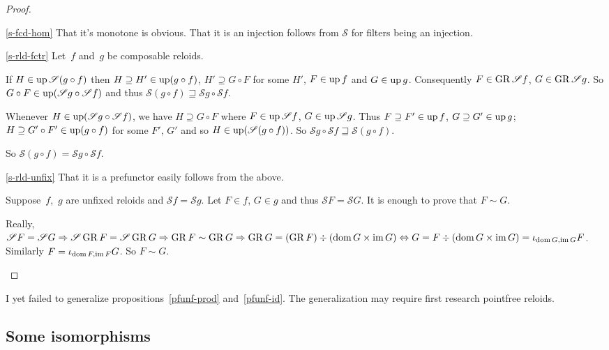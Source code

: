 \begin{proof}
~
\begin{widedisorder}
\item[\ref{s-fcd-hom}] That it's monotone is obvious.
That it is an injection follows from $\mathscr{S}$ for filters
being an injection.

\item[\ref{s-rld-fctr}]
Let~$f$ and~$g$ be composable reloids.

If $H\in\operatorname{up}\mathscr{S}(g\circ f)$ then
$H\supseteq H'\in\operatorname{up}(g\circ f)$,
$H'\supseteq G\circ F$ for some $H'$,
$F\in\operatorname{up} f$ and $G\in\operatorname{up} g$. Consequently
$F\in\operatorname{GR}\mathscr{S}f$, $G\in\operatorname{GR}\mathscr{S}g$. So
$G\circ F\in\operatorname{up}(\mathscr{S}g\circ\mathscr{S}f)$
and thus
$\mathscr{S}(g\circ f)\sqsupseteq
\mathscr{S}g\circ\mathscr{S}f$.

Whenever $H\in\operatorname{up}(\mathscr{S}g\circ\mathscr{S}f)$,
we have
$H\supseteq G\circ F$ where $F\in\operatorname{up}\mathscr{S}f$,
$G\in\operatorname{up}\mathscr{S}g$. Thus
$F\supseteq F'\in\operatorname{up} f$, $G\supseteq G'\in\operatorname{up} g$;
$H\supseteq G'\circ F'\in\operatorname{up}(g\circ f)$
for some $F'$, $G'$ and so
$H\in\operatorname{up}(\mathscr{S}(g\circ f))$. So
$\mathscr{S}g\circ\mathscr{S}f\sqsupseteq
\mathscr{S}(g\circ f)$.

So
$\mathscr{S}(g\circ f)=\mathscr{S}g\circ\mathscr{S}f$.

\item[\ref{s-rld-unfix}]
That it is a prefunctor easily follows from the above.

Suppose~$f$,~$g$ are unfixed reloids and
$\mathscr{S}f=\mathscr{S}g$.
Let $F\in f$, $G\in g$ and thus
$\mathscr{S}F=\mathscr{S}G$.
It is enough to prove that $F\sim G$.

Really, $\mathscr{S}F=\mathscr{S}G\Rightarrow
\mathscr{S}\operatorname{GR} F=\mathscr{S}\operatorname{GR} G\Rightarrow
\operatorname{GR} F\sim\operatorname{GR} G\Rightarrow
\operatorname{GR} G=(\operatorname{GR} F)\div(\operatorname{dom} G\times\operatorname{im} G)\Leftrightarrow
G=F\div(\operatorname{dom} G\times\operatorname{im} G)=
\iota_{\operatorname{dom} G,\operatorname{im} G}F$.
Similarly $F=\iota_{\operatorname{dom} F,\operatorname{im} F}G$.
So $F\sim G$.
\end{widedisorder}
\end{proof}

I yet failed to generalize propositions~\ref{pfunf-prod}
and~\ref{pfunf-id}. The generalization may require first
research pointfree reloids.

\subsection{Some isomorphisms}


